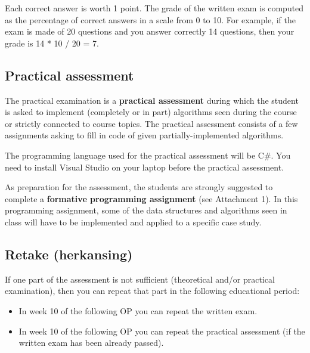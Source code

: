 	\noindent
	Each correct answer is worth 1 point. The grade of the written exam is computed as the percentage of correct answers in a scale from 0 to 10. For example, if the exam is made of 20 questions and you answer correctly 14 questions, then your grade is 14 * 10 / 20 = 7.

	\subsection{Practical assessment}
	The practical examination is a \textbf{practical assessment} during which the student is asked to implement (completely or in part) algorithms seen during the course or strictly connected to course topics. The practical assessment consists of a few assignments asking to fill in code of given partially-implemented algorithms.
	
	The programming language used for the practical assessment will be C\#. You need to install Visual Studio on your laptop before the practical assessment.
	
	As preparation for the assessment, the students are strongly suggested to complete a \textbf{formative programming assignment} (see Attachment 1). In this programming assignment, some of the data structures and algorithms seen in class will have to be implemented and applied to a specific case study.

	
	\subsection{Retake (herkansing)}
	If one part of the assessment is not sufficient (theoretical and/or practical examination), then you can repeat that part in the following educational period:
	\begin{itemize}
	\item In week 10 of the following OP you can repeat the written exam.
	\item In week 10 of the following OP you can repeat the practical assessment (if the written exam has been already passed).
	\end{itemize}
	
